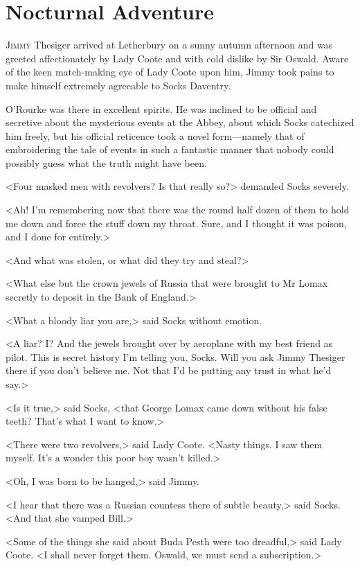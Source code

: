 \chapter{Nocturnal Adventure}

\lettrine{J}{immy} Thesiger arrived at Letherbury on a sunny autumn afternoon and was greeted affectionately by Lady Coote and with cold dislike by Sir Oswald. Aware of the keen match-making eye of Lady Coote upon him, Jimmy took pains to make himself extremely agreeable to Socks Daventry.

O'Rourke was there in excellent spirits. He was inclined to be official and secretive about the mysterious events at the Abbey, about which Socks catechized him freely, but his official reticence took a novel form—namely that of embroidering the tale of events in such a fantastic manner that nobody could possibly guess what the truth might have been.

<Four masked men with revolvers? Is that really so?> demanded Socks severely.

<Ah! I'm remembering now that there was the round half dozen of them to hold me down and force the stuff down my throat. Sure, and I thought it was poison, and I done for entirely.>

<And what was stolen, or what did they try and steal?>

<What else but the crown jewels of Russia that were brought to Mr Lomax secretly to deposit in the Bank of England.>

<What a bloody liar you are,> said Socks without emotion.

<A liar? I? And the jewels brought over by aeroplane with my best friend as pilot. This is secret history I'm telling you, Socks. Will you ask Jimmy Thesiger there if you don't believe me. Not that I'd be putting any trust in what he'd say.>

<Is it true,> said Socks, <that George Lomax came down without his false teeth? That's what I want to know.>

<There were two revolvers,> said Lady Coote. <Nasty things. I saw them myself. It's a wonder this poor boy wasn't killed.>

<Oh, I was born to be hanged,> said Jimmy.

<I hear that there was a Russian countess there of subtle beauty,> said Socks. <And that she vamped Bill.>

<Some of the things she said about Buda Pesth were too dreadful,> said Lady Coote. <I shall never forget them. Oswald, we must send a subscription.>

